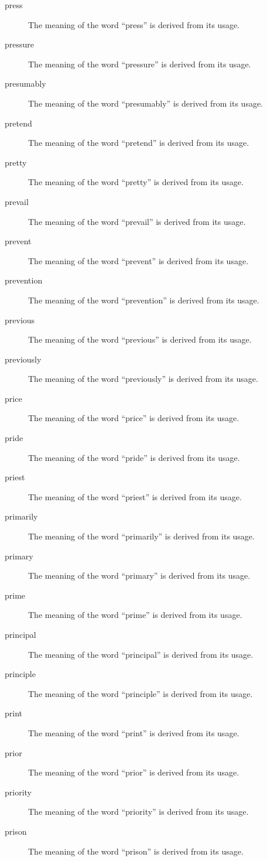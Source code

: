 \documentclass[12pt, letterpaper]{memoir}
\begin{document}
\begin{description}
\item[press] The meaning of the word ``press'' is derived from its usage.
\item[pressure] The meaning of the word ``pressure'' is derived from its usage.
\item[presumably] The meaning of the word ``presumably'' is derived from its usage.
\item[pretend] The meaning of the word ``pretend'' is derived from its usage.
\item[pretty] The meaning of the word ``pretty'' is derived from its usage.
\item[prevail] The meaning of the word ``prevail'' is derived from its usage.
\item[prevent] The meaning of the word ``prevent'' is derived from its usage.
\item[prevention] The meaning of the word ``prevention'' is derived from its usage.
\item[previous] The meaning of the word ``previous'' is derived from its usage.
\item[previously] The meaning of the word ``previously'' is derived from its usage.
\item[price] The meaning of the word ``price'' is derived from its usage.
\item[pride] The meaning of the word ``pride'' is derived from its usage.
\item[priest] The meaning of the word ``priest'' is derived from its usage.
\item[primarily] The meaning of the word ``primarily'' is derived from its usage.
\item[primary] The meaning of the word ``primary'' is derived from its usage.
\item[prime] The meaning of the word ``prime'' is derived from its usage.
\item[principal] The meaning of the word ``principal'' is derived from its usage.
\item[principle] The meaning of the word ``principle'' is derived from its usage.
\item[print] The meaning of the word ``print'' is derived from its usage.
\item[prior] The meaning of the word ``prior'' is derived from its usage.
\item[priority] The meaning of the word ``priority'' is derived from its usage.
\item[prison] The meaning of the word ``prison'' is derived from its usage.

\end{description}
\end{document}
